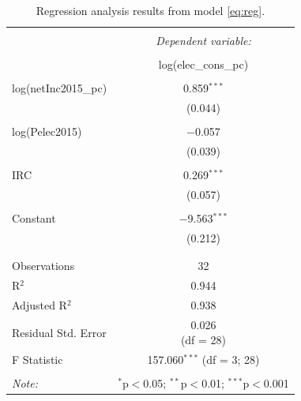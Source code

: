 \begin{table}[!htbp] \centering 
    \caption{Regression analysis results from model \eqref{eq:reg}.} 
    \label{regression_full_pc} 
  \begin{tabular}{@{\extracolsep{0pt}}lc} 
  \\[-1.8ex]\hline 
  \hline \\[-1.8ex] 
   & \multicolumn{1}{c}{\textit{Dependent variable:}} \\ 
  \cline{2-2} 
  \\[-1.8ex] & log(elec\_cons\_pc) \\ 
  \hline \\[-1.8ex] 
   log(netInc2015\_pc) & 0.859$^{***}$ \\ 
    & (0.044) \\ 
    & \\ 
   log(Pelec2015) & $-$0.057 \\ 
    & (0.039) \\ 
    & \\ 
   IRC & 0.269$^{***}$ \\ 
    & (0.057) \\ 
    & \\ 
   Constant & $-$9.563$^{***}$ \\ 
    & (0.212) \\ 
    & \\ 
  \hline \\[-1.8ex] 
  Observations & 32 \\ 
  R$^{2}$ & 0.944 \\ 
  Adjusted R$^{2}$ & 0.938 \\ 
  Residual Std. Error & \makecell{0.026 \\ (df = 28)} \\  %
    F Statistic & \makecell{157.060$^{***}$ \\ (df = 3; 28)} \\  %
  \hline 
  \hline \\[-1.8ex] 
  \textit{Note:}  & \multicolumn{1}{r}{$^{*}$p$<$0.05; $^{**}$p$<$0.01; $^{***}$p$<$0.001} \\ 
  \end{tabular} 
\end{table} 

